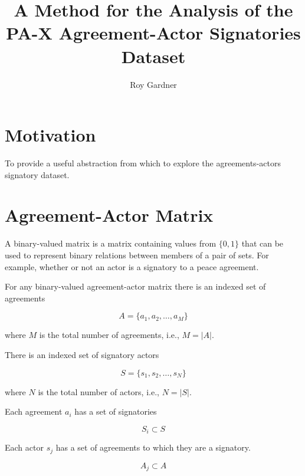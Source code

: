 \documentclass{article}
\title{A Method for the Analysis of the PA-X Agreement-Actor Signatories Dataset}
\author{Roy Gardner}
\begin{document}

\maketitle

\tableofcontents
\newpage

\section{Motivation}

To provide a useful abstraction from which to explore the agreements-actors signatory dataset.

\section{Agreement-Actor Matrix}

A binary-valued matrix is a matrix containing values from $\{0,1\}$ that can be used to represent binary relations between members of a pair of sets. For example, whether or not an actor is a signatory to a peace agreement.\newline

For any binary-valued agreement-actor matrix there is an indexed set of agreements 

\begin{equation}
A=\{a_1,a_2,…,a_M\}
\end{equation}

where $M$ is the total number of agreements, i.e., $M=|A|$.\newline

There is an indexed set of signatory actors

\begin{equation}
S=\{s_1,s_2,…,s_N\} 
\end{equation}

where $N$ is the total number of actors, i.e., $N=|S|$.\newline

Each agreement $a_i$ has a set of signatories 

\begin{equation}
S_{i}\subset S
\end{equation}

Each actor $s_j$ has a set of agreements to which they are a signatory.

\begin{equation}
A_{j}\subset A
\end{equation}
\end{document}
